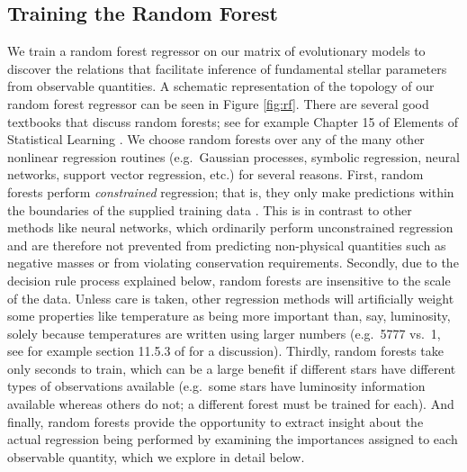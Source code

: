 \documentclass[manuscript]{aastex}
\begin{document}
\subsection{Training the Random Forest} \label{sec:forest}
We train a random forest regressor on our matrix of evolutionary models to discover the relations that facilitate inference of fundamental stellar parameters from observable quantities. A schematic representation of the topology of our random forest regressor can be seen in Figure \ref{fig:rf}. There are several good textbooks that discuss random forests; see for example Chapter 15 of Elements of Statistical Learning \citep{hastie2005elements}. We choose random forests over any of the many other nonlinear regression routines (e.g.~Gaussian processes, symbolic regression, neural networks, support vector regression, etc.) for several reasons. First, random forests perform \emph{constrained} regression; that is, they only make predictions within the boundaries of the supplied training data \citep[see e.g.~section 9.2.1 of][]{hastie2005elements}. This is in contrast to other methods like neural networks, which ordinarily perform unconstrained regression and are therefore not prevented from predicting non-physical quantities such as negative masses or from violating conservation requirements. Secondly, due to the decision rule process explained below, random forests are insensitive to the scale of the data. Unless care is taken, other regression methods will artificially weight some properties like temperature as being more important than, say, luminosity, solely because temperatures are written using larger numbers (e.g.~5777 vs.~1, see for example section 11.5.3 of \citealt{hastie2005elements} for a discussion). Thirdly, random forests take only seconds to train, which can be a large benefit if different stars have different types of observations available (e.g.~some stars have luminosity information available whereas others do not; a different forest must be trained for each). And finally, random forests provide the opportunity to extract insight about the actual regression being performed by examining the importances assigned to each observable quantity, which we explore in detail below. 
\end{document}
